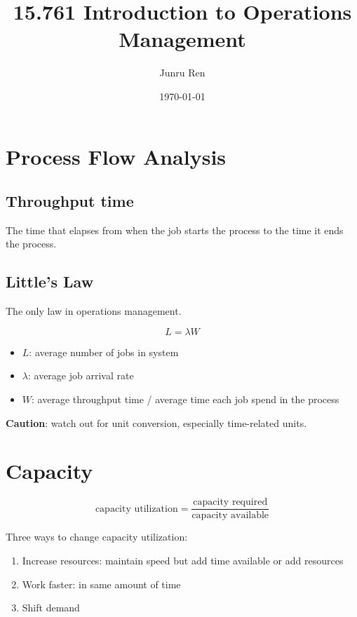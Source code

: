 \documentclass[11pt]{article}
\title{ 15.761 Introduction to Operations Management }
\author{ Junru Ren }
\date{\today}
\begin{document}
\maketitle	

\section{Process Flow Analysis}

\subsection{Throughput time}

The time that elapses from when the job starts the process to the time it ends the process.

\subsection{Little's Law}

The only law in operations management.

\begin{equation}
    L = \lambda W
\end{equation}

\begin{itemize}
    \item $L$: average number of jobs in system
    \item $\lambda$: average job arrival rate
    \item $W$: average throughput time / average time each job spend in the process
\end{itemize}

\textbf{Caution}: watch out for unit conversion, especially time-related units.


\section{Capacity}

\begin{equation}
    \text{capacity utilization} = \frac{\text{capacity required}}{\text{capacity available}}
\end{equation}

Three ways to change capacity utilization:

\begin{enumerate}
    \item Increase resources: maintain speed but add time available or add resources
    \item Work faster: in same amount of time
    \item Shift demand
\end{enumerate}
\end{document}
